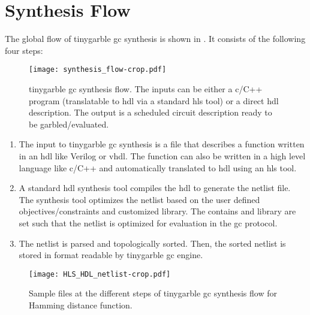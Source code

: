 \section{Synthesis Flow}\label{sec:syn-flow}
The global flow of \gls{tinygarble} \acrshort{gc} synthesis is shown in .
It consists of the following four steps:

\begin{figure}
\centering
\texttt{[image: synthesis\_flow-crop.pdf]}
\caption{\gls{tinygarble} \acrshort{gc} synthesis flow.
  The inputs can be either a \gls{c}/C++ program (translatable to \acrshort{hdl} via a standard \acrshort{hls} tool) or a direct \acrshort{hdl} description.
  The output is a scheduled circuit description ready to be garbled/evaluated.}
\label{fig:synthesis-flow}
\end{figure}

\begin{enumerate}
\item The input to \gls{tinygarble} \acrshort{gc} synthesis is a file that describes a function written in an \acrshort{hdl} like Verilog or \gls{vhdl}.
      The function can also be written in a high level language like \gls{c}/C++ and automatically translated to \acrshort{hdl} using an \acrshort{hls} tool.

\item A standard \acrshort{hdl} synthesis tool compiles the \acrshort{hdl} to generate the netlist file.
      The synthesis tool optimizes the netlist based on the user defined objectives/constraints and customized library.
      The contains and library are set such that the netlist is optimized for evaluation in the \acrshort{gc} protocol.

\item The netlist is parsed and topologically sorted.
      Then, the sorted netlist is stored in format readable by \gls{tinygarble} \acrshort{gc} engine.
\end{enumerate}

\begin{figure}
\centering
\texttt{[image: HLS\_HDL\_netlist-crop.pdf]}
\caption{Sample files at the different steps of \gls{tinygarble} \acrshort{gc} synthesis flow for Hamming distance function.}
\label{fig:globalflow_sample}
\end{figure}

